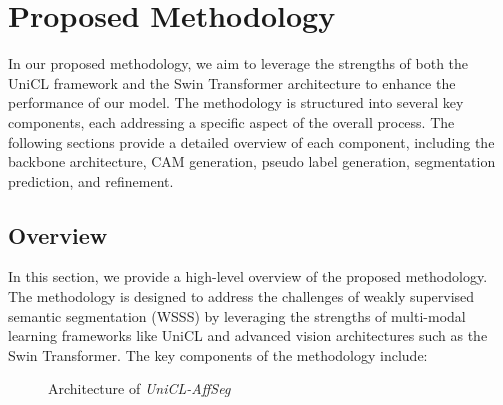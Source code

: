 \chapter{Proposed Methodology}
\label{chap:methodology}

In our proposed methodology, we aim to leverage the strengths of both the UniCL framework and the Swin Transformer architecture to enhance the performance of our model. The methodology is structured into several key components, each addressing a specific aspect of the overall process. The following sections provide a detailed overview of each component, including the backbone architecture, CAM generation, pseudo label generation, segmentation prediction, and refinement.

\section{Overview}
\label{sec:overview}
In this section, we provide a high-level overview of the proposed methodology. The methodology is designed to address the challenges of weakly supervised semantic segmentation (WSSS) by leveraging the strengths of multi-modal learning frameworks like UniCL and advanced vision architectures such as the Swin Transformer. The key components of the methodology include:

\begin{figure}
    \centering
    \caption{Architecture of \textit{UniCL-AffSeg}}
    \label{fig:architecture}
\end{figure}

